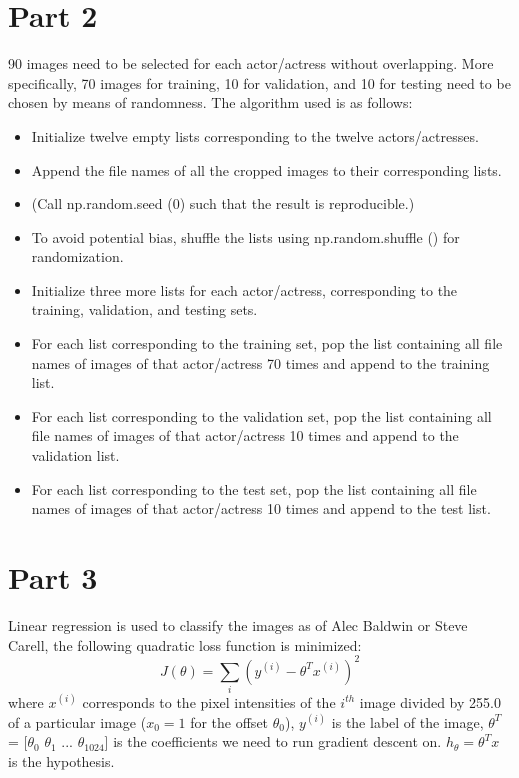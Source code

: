 \documentclass{article}
\begin{document}
\section*{Part 2}
90 images need to be selected for each actor/actress without overlapping. More specifically, 70 images for training, 10 for validation, and 10 for testing need to be chosen by means of randomness. The algorithm used is as follows:

\begin{itemize}
    \item Initialize twelve empty lists corresponding to the twelve actors/actresses.
    \item Append the file names of all the cropped images to their corresponding lists.
    \item (Call np.random.seed (0) such that the result is reproducible.)
    \item To avoid potential bias, shuffle the lists using np.random.shuffle () for randomization.
    \item Initialize three more lists for each actor/actress, corresponding to the training, validation, and testing sets.
    \item For each list corresponding to the training set, pop the list containing all file names of images of that actor/actress 70 times and append to the training list.
    \item For each list corresponding to the validation set, pop the list containing all file names of images of that actor/actress 10 times and append to the validation list.
    \item For each list corresponding to the test set, pop the list containing all file names of images of that actor/actress 10 times and append to the test list.
\end{itemize}

\section*{Part 3}
Linear regression is used to classify the images as of Alec Baldwin or Steve Carell, the following quadratic loss function is minimized:
\begin{equation}
   J(\theta) = \sum_i{(y^{(i)}-\theta^{T}x^{(i)})^2}
\end{equation}
where $x^{(i)}$ corresponds to the pixel intensities of the $i^{th}$ image divided by 255.0 of a particular image ($x_0 = 1$ for the offset $\theta_0$), $y^{(i)}$ is the label of the image, $\theta^T$ = [$\theta_0$ $\theta_1$ ... $\theta_{1024}$] is the coefficients we need to run gradient descent on. $h_{\theta} = \theta^Tx$ is the hypothesis.
\end{document}
